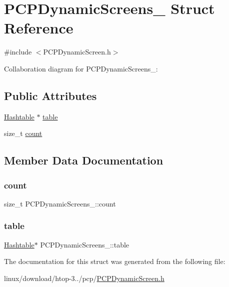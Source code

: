 \hypertarget{structPCPDynamicScreens__}{}\section{P\+C\+P\+Dynamic\+Screens\+\_\+ Struct Reference}
\label{structPCPDynamicScreens__}


{\ttfamily \#include $<$P\+C\+P\+Dynamic\+Screen.\+h$>$}



Collaboration diagram for P\+C\+P\+Dynamic\+Screens\+\_\+\+:
\subsection*{Public Attributes}
\begin{DoxyCompactItemize}
\item 
\hyperlink{Hashtable_8h_af67f943dab16c5d7d465c18053edf47f}{Hashtable} $\ast$ \hyperlink{structPCPDynamicScreens___ad5c48bd006fd9b5393c7930030cf7a1d}{table}
\item 
size\+\_\+t \hyperlink{structPCPDynamicScreens___a62c96e6641e0d20eb87f50d40fa8e919}{count}
\end{DoxyCompactItemize}


\subsection{Member Data Documentation}
\mbox{\label{structPCPDynamicScreens___a62c96e6641e0d20eb87f50d40fa8e919}} 
\subsubsection{\texorpdfstring{count}{count}}
{\footnotesize\ttfamily size\+\_\+t P\+C\+P\+Dynamic\+Screens\+\_\+\+::count}

\mbox{\label{structPCPDynamicScreens___ad5c48bd006fd9b5393c7930030cf7a1d}} 
\subsubsection{\texorpdfstring{table}{table}}
{\footnotesize\ttfamily \hyperlink{Hashtable_8h_af67f943dab16c5d7d465c18053edf47f}{Hashtable}$\ast$ P\+C\+P\+Dynamic\+Screens\+\_\+\+::table}



The documentation for this struct was generated from the following file\+:\begin{DoxyCompactItemize}
\item 
linux/download/htop-\/3../pcp/\hyperlink{PCPDynamicScreen_8h}{P\+C\+P\+Dynamic\+Screen.\+h}\end{DoxyCompactItemize}
